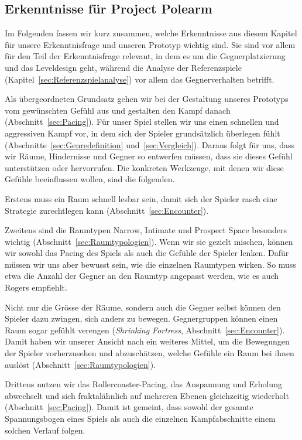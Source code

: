 \documentclass[../Main.tex]{subfiles}
\begin{document}
\subsection{Erkenntnisse für Project Polearm} \label{sec:ZwischenfazitLD}

Im Folgenden fassen wir kurz zusammen, welche Erkenntnisse aus diesem Kapitel für unsere Erkenntnisfrage und unseren Prototyp wichtig sind. Sie sind vor allem für den Teil der Erkenntnisfrage relevant, in dem es um die Gegnerplatzierung und das Leveldesign geht, während die Analyse der Referenzspiele (Kapitel~\ref{sec:Referenzspielanalyse}) vor allem das Gegnerverhalten betrifft.

Als übergeordneten Grundsatz gehen wir bei der Gestaltung unseres Prototyps vom gewünschten Gefühl aus und gestalten den Kampf danach (Abschnitt~\ref{sec:Pacing}). Für unser Spiel stellen wir uns einen schnellen und aggressiven Kampf vor, in dem sich der Spieler grundsätzlich überlegen fühlt (Abschnitte~\ref{sec:Genredefinition} und~\ref{sec:Vergleich}). Daraus folgt für uns, dass wir Räume, Hindernisse und Gegner so entwerfen müssen, dass sie dieses Gefühl unterstützen oder hervorrufen. Die konkreten Werkzeuge, mit denen wir diese Gefühle beeinflussen wollen, sind die folgenden.

Erstens muss ein Raum schnell lesbar sein, damit sich der Spieler rasch eine Strategie zurechtlegen kann (Abschnitt~\ref{sec:Encounter}).

Zweitens sind die Raumtypen Narrow, Intimate und Prospect Space besonders wichtig (Abschnitt~\ref{sec:Raumtypologien}). Wenn wir sie gezielt mischen, können wir sowohl das Pacing des Spiels als auch die Gefühle der Spieler lenken. Dafür müssen wir uns aber bewusst sein, wie die einzelnen Raumtypen wirken. So muss etwa die Anzahl der Gegner an den Raumtyp angepasst werden, wie es auch Rogers empfiehlt.\autocite[245]{rogers2014levelup}

Nicht nur die Grösse der Räume, sondern auch die Gegner selbst können den Spieler dazu zwingen, sich anders zu bewegen. Gegnergruppen können einen Raum sogar gefühlt verengen (\textit{Shrinking Fortress}, Abschnitt~\ref{sec:Encounter}). Damit haben wir unserer Ansicht nach ein weiteres Mittel, um die Bewegungen der Spieler vorherzusehen und abzuschätzen, welche Gefühle ein Raum bei ihnen auslöst (Abschnitt~\ref{sec:Raumtypologien}).

Drittens nutzen wir das Rollercoaster-Pacing, das Anspannung und Erholung abwechselt und sich fraktalähnlich auf mehreren Ebenen gleichzeitig wiederholt (Abschnitt~\ref{sec:Pacing}). Damit ist gemeint, dass sowohl der gesamte Spannungsbogen eines Spiels als auch die einzelnen Kampfabschnitte einem solchen Verlauf folgen.
\end{document}
